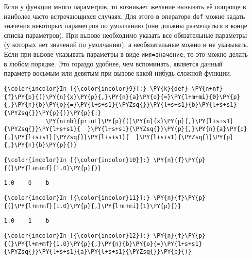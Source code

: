     Если у функции много параметров, то возникает желание вызывать её
попроще в наиболее часто встречающихся случаях. Для этого в операторе
\texttt{def} можно задать значения некоторых параметров по умолчанию
(они должны размещаться в конце списка параметров). При вызове
необходимо указать все обязательные параметры (у которых нет значений по
умолчанию), а необязательные можно и не указывать. Если при вызове
указывать параметры в виде \texttt{имя=значение}, то это можно делать в
любом порядке. Это гораздо удобнее, чем вспоминать, является данный
параметр восьмым или девятым при вызове какой-нибудь сложной функции.

    \begin{Verbatim}[commandchars=\\\{\}]
{\color{incolor}In [{\color{incolor}9}]:} \PY{k}{def} \PY{n+nf}{f}\PY{p}{(}\PY{n}{x}\PY{p}{,}\PY{n}{a}\PY{o}{=}\PY{l+m+mi}{0}\PY{p}{,}\PY{n}{b}\PY{o}{=}\PY{l+s+s1}{\PYZsq{}}\PY{l+s+s1}{b}\PY{l+s+s1}{\PYZsq{}}\PY{p}{)}\PY{p}{:}
            \PY{n+nb}{print}\PY{p}{(}\PY{n}{x}\PY{p}{,}\PY{l+s+s1}{\PYZsq{}}\PY{l+s+s1}{  }\PY{l+s+s1}{\PYZsq{}}\PY{p}{,}\PY{n}{a}\PY{p}{,}\PY{l+s+s1}{\PYZsq{}}\PY{l+s+s1}{  }\PY{l+s+s1}{\PYZsq{}}\PY{p}{,}\PY{n}{b}\PY{p}{)}
\end{Verbatim}

    \begin{Verbatim}[commandchars=\\\{\}]
{\color{incolor}In [{\color{incolor}10}]:} \PY{n}{f}\PY{p}{(}\PY{l+m+mf}{1.0}\PY{p}{)}
\end{Verbatim}

    \begin{Verbatim}[commandchars=\\\{\}]
1.0    0    b

    \end{Verbatim}

    \begin{Verbatim}[commandchars=\\\{\}]
{\color{incolor}In [{\color{incolor}11}]:} \PY{n}{f}\PY{p}{(}\PY{l+m+mf}{1.0}\PY{p}{,}\PY{l+m+mi}{1}\PY{p}{)}
\end{Verbatim}

    \begin{Verbatim}[commandchars=\\\{\}]
1.0    1    b

    \end{Verbatim}

    \begin{Verbatim}[commandchars=\\\{\}]
{\color{incolor}In [{\color{incolor}12}]:} \PY{n}{f}\PY{p}{(}\PY{l+m+mf}{1.0}\PY{p}{,}\PY{n}{b}\PY{o}{=}\PY{l+s+s1}{\PYZsq{}}\PY{l+s+s1}{a}\PY{l+s+s1}{\PYZsq{}}\PY{p}{)}
\end{Verbatim}

